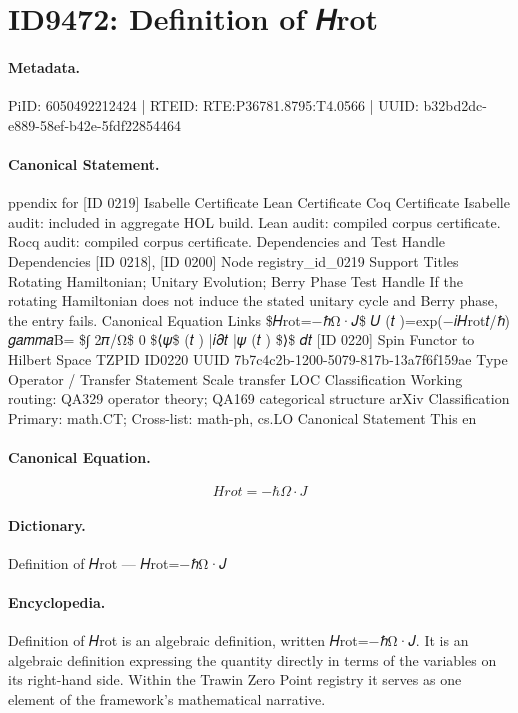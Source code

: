 \section*{ID9472: Definition of 𝐻rot}
\paragraph{Metadata.}
PiID: 6050492212424 | RTEID: RTE:P36781.8795:T4.0566 | UUID: b32bd2dc-e889-58ef-b42e-5fdf22854464

\paragraph{Canonical Statement.}
ppendix for [ID 0219] Isabelle Certificate Lean Certificate Coq Certificate Isabelle audit: included in aggregate HOL build. Lean audit: compiled corpus certificate. Rocq audit: compiled corpus certificate. Dependencies and Test Handle Dependencies [ID 0218], [ID 0200] Node registry\_id\_0219 Support Titles Rotating Hamiltonian; Unitary Evolution; Berry Phase Test Handle If the rotating Hamiltonian does not induce the stated unitary cycle and Berry phase, the entry fails. Canonical Equation Links \$𝐻rot=−ℏΩ·𝐽\$ 𝑈 (𝑡 )=exp(−𝑖𝐻rot𝑡/ℏ) 𝑔𝑎𝑚𝑚𝑎B= \$∫ 2𝜋/Ω\$ 0 \$⟨𝜓\$ (𝑡 ) |𝑖𝜕𝑡 |𝜓 (𝑡 ) \$⟩\$ 𝑑𝑡 [ID 0220] Spin Functor to Hilbert Space TZPID ID0220 UUID 7b7c4c2b-1200-5079-817b-13a7f6f159ae Type Operator / Transfer Statement Scale transfer LOC Classification Working routing: QA329 operator theory; QA169 categorical structure arXiv Classification Primary: math.CT; Cross-list: math-ph, cs.LO Canonical Statement This en

\paragraph{Canonical Equation.}
\[
𝐻rot=−ℏΩ·𝐽
\]

\paragraph{Dictionary.}
Definition of 𝐻rot — 𝐻rot=−ℏΩ·𝐽

\paragraph{Encyclopedia.}
Definition of 𝐻rot is an algebraic definition, written 𝐻rot=−ℏΩ·𝐽. It is an algebraic definition expressing the quantity directly in terms of the variables on its right-hand side. Within the Trawin Zero Point registry it serves as one element of the framework's mathematical narrative.
